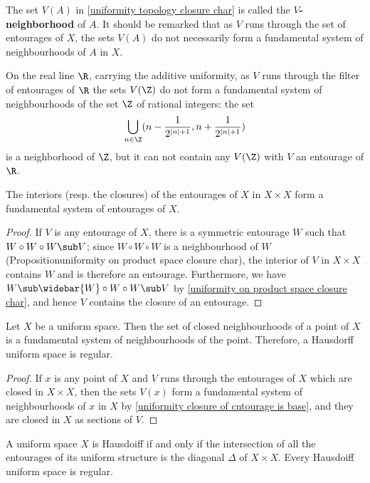The set $V(A)$ in \cref{uniformity topology closure char} is called the \textbf{$V$-neighborhood} of $A$. It should be remarked that as $V$ runs through the set of entourages of $X$, the sets $V(A)$ do not necessarily form a fundamental system of neighbourhoods of $A$ in $X$.
\begin{example}
On the real line $\R$, carrying the additive uniformity, as $V$ runs through the filter of entourages of $\R$ the sets $V(\Z)$ do not form a fundamental system of neighbourhoods of the set $\Z$ of rational integers: the set
\[\bigcup_{n\in\Z}(n-\frac{1}{2^{|n|+1}},n+\frac{1}{2^{|n|+1}})\]
is a neighborhood of $\Z$, but it can not contain any $V(\Z)$ with $V$ an  entourage of $\R$.
\end{example}
\begin{corollary}\label{uniformity closure of cntourage is base}
The interiors (resp. the closures) of the entourages of $X$ in $X\times X$ form a fundamental system of entourages of $X$.
\end{corollary}
\begin{proof}
If $V$ is any entourage of $X$, there is a symmetric entourage $W$ such that $W\circ W\circ W\sub V$; since $W\circ W\circ W$ is a neighbourhood of $W$ (Proposition{uniformity on product space closure char}), the interior of $V$ in $X\times X$ contains $W$ and is therefore an entourage. Furthermore, we have $W\sub\widebar{W}\circ W\circ W\sub V$ by \cref{uniformity on product space closure char}, and hence $V$ contains the closure of an entourage.
\end{proof}
\begin{corollary}\label{uniform space is regular}
Let $X$ be a uniform space. Then the set of closed neighbourhoods of a point of $X$ is a fundamental system of neighbourhoods of the point. Therefore, a Hausdorff uniform space is regular.
\end{corollary}
\begin{proof}
If $x$ is any point of $X$ and $V$ runs through the entourages of $X$ which are closed in $X\times X$, then the sets $V(x)$ form a fundamental system of neighbourhoods of $x$ in $X$ by \cref{uniformity closure of cntourage is base}, and they are closed in $X$ as sections of $V$.
\end{proof}
\begin{proposition}\label{uniform space Hausdorff iff}
A uniform space $X$ is Hausdoiff if and only if the intersection of all the entourages of its uniform structure is the diagonal $\Delta$ of $X\times X$. Every Hausdoiff uniform space is regular.
\end{proposition}
